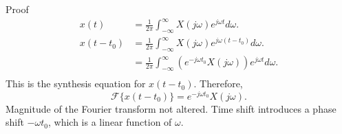 \begin{frame}[plain]{Proof}
    {
        \begin{align*}
          x(t) &= \frac{1}{2\pi}\int_{-\infty}^{\infty}X(j\omega)e^{j\omega t} d\omega.\\
          x(t - t_0) &= \frac{1}{2\pi}\int_{-\infty}^{\infty}X(j\omega)e^{j\omega (t-t_0)} d\omega.\\
           &= \frac{1}{2\pi}\int_{-\infty}^{\infty}\left(e^{-j\omega t_0}X(j\omega)\right)e^{j\omega t} d\omega.\\
        \end{align*}
        \pause
        This is the synthesis equation for $x(t-t_0)$. Therefore,
        \begin{equation*}
            \mathcal{F}\{x(t-t_0)\} = e^{-j\omega t_0}X(j\omega).
        \end{equation*}
        Magnitude of the Fourier transform not altered. Time shift introduces a phase shift $-\omega t_0$, which is a linear function of $\omega$.
    }
\end{frame}

